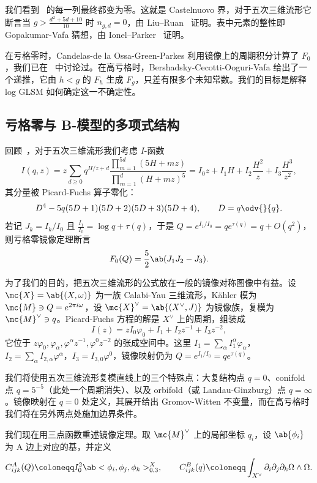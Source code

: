 我们看到~ 的每一列最终都变为零。这就是 Castelnuovo 界，对于五次三维流形它断言当 \(g > \frac{d^2+5d+10}{10}\) 时 \(n_{g,d} = 0\)，由 Liu--Ruan~\cite{LiuRuanCastelnuovo} 证明。表中元素的整性即 Gopakumar-Vafa 猜想，由 Ionel--Parker~\cite{IonelParker2018} 证明。

在亏格零时，Candelas-de la Ossa-Green-Parkes 利用镜像上的周期积分计算了 \(F_0\)，我们已在~ 中讨论过。在高亏格时，Bershadsky-Cecotti-Ooguri-Vafa 给出了一个递推，它由 \(h < g\) 的 \(F_h\) 生成 \(F_g\)，只差有限多个未知常数。我们的目标是解释 log GLSM 如何确定这一不确定性。

\subsection{亏格零与 B-模型的多项式结构}%
\label{sub:Genus zero and the polynomial structure of the B-model}

回顾~，对于五次三维流形我们考虑 \(I\)-函数
\[
    I(q,z) = z\sum_{d \geq 0} q^{H/z+d} \frac{\prod_{m=1}^{5d}(5H+mz)}{\prod_{m=1}^d (H+mz)^5} = I_0 z + I_1 H + I_2 \frac{H^2}{z} + I_3 \frac{H^3}{z^2},
\]
其分量被 Picard-Fuchs 算子零化：
\[ D^4 - 5q(5D+1)(5D+2)(5D+3)(5D+4), \qquad D = q \odv{}{q}. \]
若记 \(J_k = I_k/I_0\) 且 \(\frac{I_1}{I_0} = \log q + \tau(q)\)，于是 \(Q = e^{I_1/I_0} = qe^{\tau(q)} = q + O(q^2)\)，则亏格零镜像定理断言
\[ F_0(Q) = \frac{5}{2}\ab(J_1 J_2 - J_3). \]

为了我们的目的，把五次三维流形的公式放在一般的镜像对称图像中有益。设 \(\mc{X} = \ab\{(X,\omega)\}\) 为一族 Calabi-Yau 三维流形，K\"ahler 模为 \(\mc{M} \ni Q = e^{2\pi i \omega}\)，设 \(\mc{X}^{\vee} = \ab\{(X^{\vee},J)\}\) 为镜像族，复模为 \(\mc{M}^{\vee} \ni q\)。Picard-Fuchs 方程的解是 \(X^{\vee}\) 上的周期，组装成
\[ I(z) = zI_0\varphi_0 + I_1 + I_2 z^{-1} + I_3 z^{-2}, \]
它位于 \(z\varphi_0, \varphi_{\alpha}, \varphi^{\alpha}z^{-1}, \varphi^0 z^{-2}\) 的张成空间中。这里 \(I_1 = \sum_{\alpha} I_1^{\alpha}\varphi_{\alpha}\)，\(I_2 = \sum_{\alpha} I_{2,\alpha}\varphi^{\alpha}\)，\(I_3 = I_{3,0}\varphi^0\)，镜像映射仍为 \(Q = e^{I_1/I_0} = qe^{\tau(q)}\)。

我们将使用五次三维流形复模直线上的三个特殊点：大复结构点 \(q=0\)、conifold 点 \(q = 5^{-5}\)（此处一个周期消失）、以及 orbifold（或 Landau-Ginzburg）点 \(q = \infty\)。镜像映射在 \(q=0\) 处定义，其展开给出 Gromov-Witten 不变量，而在高亏格时我们将在另外两点处施加边界条件。

我们现在用三点函数重述镜像定理。取 \(\mc{M}^{\vee}\) 上的局部坐标 \(q_i\)，设 \(\ab\{\phi_i\}\) 为 A 边上对应的基，并定义
\[ C^A_{ijk}(Q) \coloneqq I_0^2 \ab<\phi_i, \phi_j, \phi_k>^X_{0,3}, \qquad C^B_{ijk}(q) \coloneqq \int_{X^{\vee}} \partial_i \partial_j \partial_k \Omega \wedge \Omega. \]


